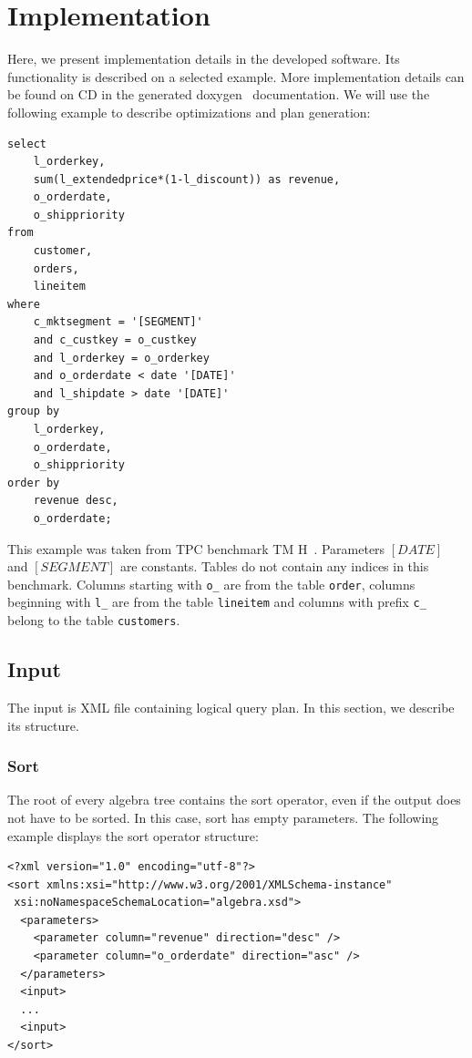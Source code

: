 \chapter{Implementation}
\label{implementation}
Here, we present implementation details in the developed software. Its functionality is described on a selected example. More implementation details can be found on CD in the generated doxygen~\cite{doxygen} documentation. We will use the following example to describe optimizations and plan generation:


\begin{verbatim}
select
    l_orderkey,
    sum(l_extendedprice*(1-l_discount)) as revenue,
    o_orderdate,
    o_shippriority
from
    customer,
    orders,
    lineitem
where
    c_mktsegment = '[SEGMENT]'
    and c_custkey = o_custkey
    and l_orderkey = o_orderkey
    and o_orderdate < date '[DATE]'
    and l_shipdate > date '[DATE]'
group by
    l_orderkey,
    o_orderdate,
    o_shippriority
order by
    revenue desc,
    o_orderdate;
\end{verbatim}

This example was taken from TPC benchmark TM H~\cite{benchmark}. Parameters $[DATE]$ and $[SEGMENT]$ are constants. Tables do not contain any indices in this benchmark. Columns starting with \verb|o_| are from the table \verb|order|, columns beginning with \verb|l_| are from the table \verb|lineitem| and columns with prefix \verb|c_| belong to the table \verb|customers|.



\section{Input}

The input is XML file containing logical query plan. In this section, we describe its structure. 

\subsection{Sort}

The root of every algebra tree contains the sort operator, even if the output does not have to be sorted. In this case, sort has empty parameters. The following example displays the sort operator structure:


\begin{lstlisting}
<?xml version="1.0" encoding="utf-8"?>
<sort xmlns:xsi="http://www.w3.org/2001/XMLSchema-instance"
 xsi:noNamespaceSchemaLocation="algebra.xsd">
  <parameters>
    <parameter column="revenue" direction="desc" />
    <parameter column="o_orderdate" direction="asc" />
  </parameters>
  <input>
  ...
  <input>
</sort>
\end{lstlisting}

